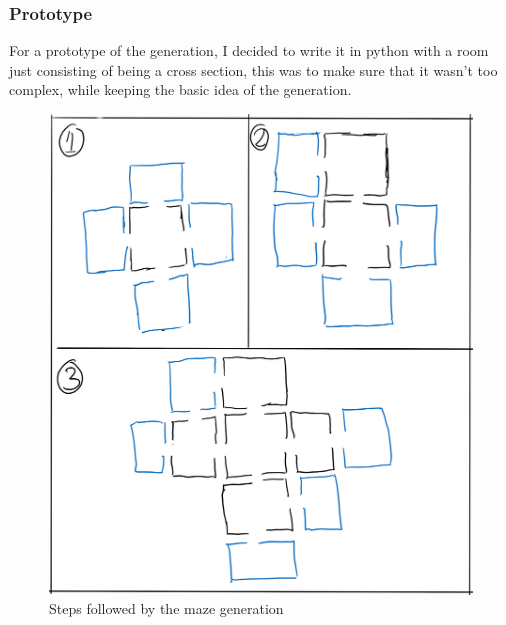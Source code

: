 \documentclass{article}
\begin{document}
            \subsubsection{Prototype}
            For a prototype of the generation, I decided to write it in python with a room just consisting of being a cross section, this was to make sure that it wasn't too complex, while keeping the basic idea of the generation.
            \begin{figure}[hbt!]
                \centerline{\includegraphics[scale=0.5]{img/Design/Maze Generation.png}}
                \caption{Steps followed by the maze generation}
                \label{fig}
            \end{figure}
\end{document}

